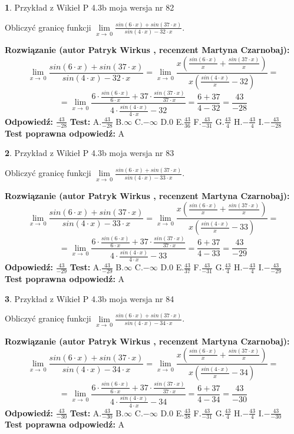 \documentclass[12pt, a4paper]{article}
\theoremstyle{definition} %
\newtheorem{zad}{}
\newcommand{\zadStart}[1]{\begin{zad}#1\newline}
\newcommand{\zadStop}{\end{zad}}
\newcommand{\rozwStart}[2]{\noindent \textbf{Rozwiązanie (autor #1 , recenzent #2): }\newline}
\newcommand{\rozwStop}{\newline}
\newcommand{\odpStart}{\noindent \textbf{Odpowiedź:}\newline}
\newcommand{\odpStop}{\newline}
\newcommand{\testStart}{\noindent \textbf{Test:}\newline}
\newcommand{\testStop}{\newline}
\newcommand{\kluczStart}{\noindent \textbf{Test poprawna odpowiedź:}\newline}
\newcommand{\kluczStop}{\newline}
\begin{document}
\zadStart{Przykład z Wikieł P 4.3b moja wersja nr 82}


Obliczyć granicę funkcji $\lim\limits_{x\to\ 0}\frac{sin(6 \cdot x)+sin(37 \cdot x)}{sin(4 \cdot x)-32 \cdot x}$.
\zadStop
\rozwStart{Patryk Wirkus}{Martyna Czarnobaj}
$$\lim\limits_{x\to\ 0}\frac{sin(6 \cdot x)+sin(37 \cdot x)}{sin(4 \cdot x)-32 \cdot x}=\lim\limits_{x\to\ 0}\frac{x(\frac{sin(6 \cdot x)}{x}+\frac{sin(37 \cdot x)}{x})}{x(\frac{sin(4 \cdot x)}{x}-32)}=$$
$$=\lim\limits_{x\to\ 0}\frac{6 \cdot \frac{sin(6 \cdot x)}{6 \cdot x}+37 \cdot \frac{sin(37 \cdot x)}{37 \cdot x}}{4 \cdot \frac{sin(4 \cdot x)}{4 \cdot x}-32}=\frac{6+37}{4-32} = \frac{43}{-28}$$
\rozwStop
\odpStart
$\frac{43}{-28}$
\odpStop
\testStart
A.$\frac{43}{-28}$
B.$\infty$
C.$-\infty$
D.$0$
E.$\frac{43}{36}$
F.$\frac{43}{-31}$
G.$\frac{43}{4}$
H.$-\frac{43}{4}$
I.$-\frac{43}{-28}$
\testStop
\kluczStart
A
\kluczStop



\zadStart{Przykład z Wikieł P 4.3b moja wersja nr 83}


Obliczyć granicę funkcji $\lim\limits_{x\to\ 0}\frac{sin(6 \cdot x)+sin(37 \cdot x)}{sin(4 \cdot x)-33 \cdot x}$.
\zadStop
\rozwStart{Patryk Wirkus}{Martyna Czarnobaj}
$$\lim\limits_{x\to\ 0}\frac{sin(6 \cdot x)+sin(37 \cdot x)}{sin(4 \cdot x)-33 \cdot x}=\lim\limits_{x\to\ 0}\frac{x(\frac{sin(6 \cdot x)}{x}+\frac{sin(37 \cdot x)}{x})}{x(\frac{sin(4 \cdot x)}{x}-33)}=$$
$$=\lim\limits_{x\to\ 0}\frac{6 \cdot \frac{sin(6 \cdot x)}{6 \cdot x}+37 \cdot \frac{sin(37 \cdot x)}{37 \cdot x}}{4 \cdot \frac{sin(4 \cdot x)}{4 \cdot x}-33}=\frac{6+37}{4-33} = \frac{43}{-29}$$
\rozwStop
\odpStart
$\frac{43}{-29}$
\odpStop
\testStart
A.$\frac{43}{-29}$
B.$\infty$
C.$-\infty$
D.$0$
E.$\frac{43}{37}$
F.$\frac{43}{-31}$
G.$\frac{43}{4}$
H.$-\frac{43}{4}$
I.$-\frac{43}{-29}$
\testStop
\kluczStart
A
\kluczStop



\zadStart{Przykład z Wikieł P 4.3b moja wersja nr 84}


Obliczyć granicę funkcji $\lim\limits_{x\to\ 0}\frac{sin(6 \cdot x)+sin(37 \cdot x)}{sin(4 \cdot x)-34 \cdot x}$.
\zadStop
\rozwStart{Patryk Wirkus}{Martyna Czarnobaj}
$$\lim\limits_{x\to\ 0}\frac{sin(6 \cdot x)+sin(37 \cdot x)}{sin(4 \cdot x)-34 \cdot x}=\lim\limits_{x\to\ 0}\frac{x(\frac{sin(6 \cdot x)}{x}+\frac{sin(37 \cdot x)}{x})}{x(\frac{sin(4 \cdot x)}{x}-34)}=$$
$$=\lim\limits_{x\to\ 0}\frac{6 \cdot \frac{sin(6 \cdot x)}{6 \cdot x}+37 \cdot \frac{sin(37 \cdot x)}{37 \cdot x}}{4 \cdot \frac{sin(4 \cdot x)}{4 \cdot x}-34}=\frac{6+37}{4-34} = \frac{43}{-30}$$
\rozwStop
\odpStart
$\frac{43}{-30}$
\odpStop
\testStart
A.$\frac{43}{-30}$
B.$\infty$
C.$-\infty$
D.$0$
E.$\frac{43}{38}$
F.$\frac{43}{-31}$
G.$\frac{43}{4}$
H.$-\frac{43}{4}$
I.$-\frac{43}{-30}$
\testStop
\kluczStart
A
\kluczStop
\end{document}
